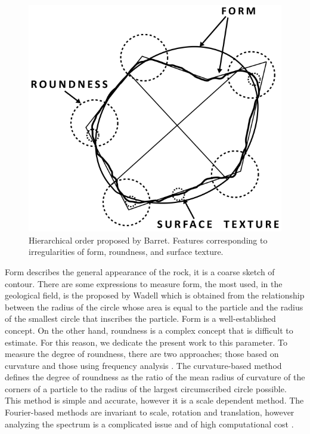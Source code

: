 \documentclass[conference]{IEEEtran}
\begin{document}
\begin{figure}[htbp]
\centerline{\includegraphics[scale=0.4]{fig1.png}}
\caption{Hierarchical order proposed by Barret. Features corresponding to irregularities of form, roundness, and surface texture.}
\label{fig1}
\end{figure}

Form describes the general appearance of the rock, it is a coarse sketch of contour. There are some expressions to measure form,  the most used, in the geological field, is the proposed by Wadell \cite{b6} which is obtained from the relationship between the radius of the circle whose area is equal to the particle and the radius of the smallest circle that inscribes the particle. Form is a well-established concept. On the other hand, roundness is a complex concept that is difficult to estimate. For this reason, we dedicate the present work to this parameter. To measure the degree of roundness, there are two approaches; those based on curvature \cite{b7} and those using frequency analysis \cite{b8}. The curvature-based method defines the degree of roundness as the ratio of the mean radius of curvature of the corners of a particle to the radius of the largest circumscribed circle possible. This method is simple and accurate, however it is a scale dependent method. The Fourier-based methods are invariant to scale, rotation and translation, however analyzing the spectrum is a complicated issue and of high computational cost \cite{b8}.
\end{document}
